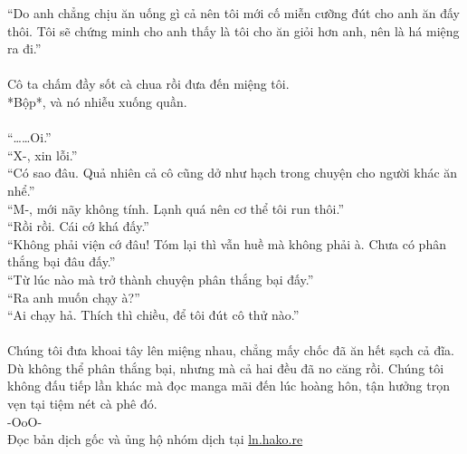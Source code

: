 \documentclass[12pt,a4paper, twosides]{book}
\begin{document}
“Do anh chẳng chịu ăn uống gì cả nên tôi mới cố miễn cưỡng đút cho anh ăn đấy thôi. Tôi sẽ chứng minh cho anh thấy là tôi cho ăn giỏi hơn anh, nên là há miệng ra đi.”\\
\\
Cô ta chấm đầy sốt cà chua rồi đưa đến miệng tôi.\\
*Bộp*, và nó nhiễu xuống quần.\\
\\
“……Oi.”\\
“X-, xin lỗi.”\\
“Có sao đâu. Quả nhiên cả cô cũng dở như hạch trong chuyện cho người khác ăn nhể.”\\
“M-, mới nãy không tính. Lạnh quá nên cơ thể tôi run thôi.”\\
“Rồi rồi. Cái cớ khá đấy.”\\
“Không phải viện cớ đâu! Tóm lại thì vẫn huề mà không phải à. Chưa có phân thắng bại đâu đấy.”\\
“Từ lúc nào mà trở thành chuyện phân thắng bại đấy.”\\
“Ra anh muốn chạy à?”\\
“Ai chạy hả. Thích thì chiều, để tôi đút cô thử nào.”\\
\\
Chúng tôi đưa khoai tây lên miệng nhau, chẳng mấy chốc đã ăn hết sạch cả đĩa.\\
Dù không thể phân thắng bại, nhưng mà cả hai đều đã no căng rồi. Chúng tôi không đấu tiếp lần khác mà đọc manga mãi đến lúc hoàng hôn, tận hưởng trọn vẹn tại tiệm nét cà phê đó.\\
-OoO-\\
Đọc bản dịch gốc và ủng hộ nhóm dịch tại \href{https://ln.hako.re/}{ln.hako.re}\\
\newpage
\end{document}
